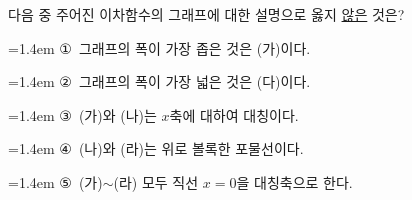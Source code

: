 다음 중 주어진 이차함수의 그래프에 대한 설명으로 옳지 \underline{않은} 것은?
\par\medskip\par\noindent\hangindent=1.4em {\small ①}\ 그래프의 폭이 가장 좁은 것은 (가)이다.\par\noindent\hangindent=1.4em {\small ②}\ 그래프의 폭이 가장 넓은 것은 (다)이다.\par\noindent\hangindent=1.4em {\small ③}\ (가)와 (나)는 $x$축에 대하여 대칭이다.\par\noindent\hangindent=1.4em {\small ④}\ (나)와 (라)는 위로 볼록한 포물선이다.\par\noindent\hangindent=1.4em {\small ⑤}\ (가)$\sim$(라) 모두 직선 $x=0$을 대칭축으로 한다.\par\medskip
